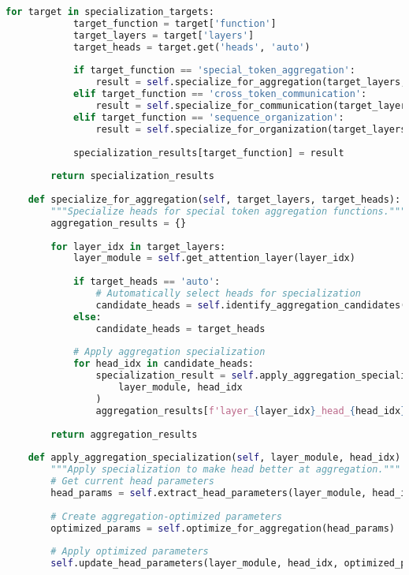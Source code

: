 \begin{lstlisting}[language=Python, caption=Attention pattern analysis and optimization framework]
        for target in specialization_targets:
            target_function = target['function']
            target_layers = target['layers']
            target_heads = target.get('heads', 'auto')
            
            if target_function == 'special_token_aggregation':
                result = self.specialize_for_aggregation(target_layers, target_heads)
            elif target_function == 'cross_token_communication':
                result = self.specialize_for_communication(target_layers, target_heads)
            elif target_function == 'sequence_organization':
                result = self.specialize_for_organization(target_layers, target_heads)
            
            specialization_results[target_function] = result
        
        return specialization_results
    
    def specialize_for_aggregation(self, target_layers, target_heads):
        """Specialize heads for special token aggregation functions."""
        aggregation_results = {}
        
        for layer_idx in target_layers:
            layer_module = self.get_attention_layer(layer_idx)
            
            if target_heads == 'auto':
                # Automatically select heads for specialization
                candidate_heads = self.identify_aggregation_candidates(layer_module)
            else:
                candidate_heads = target_heads
            
            # Apply aggregation specialization
            for head_idx in candidate_heads:
                specialization_result = self.apply_aggregation_specialization(
                    layer_module, head_idx
                )
                aggregation_results[f'layer_{layer_idx}_head_{head_idx}'] = specialization_result
        
        return aggregation_results
    
    def apply_aggregation_specialization(self, layer_module, head_idx):
        """Apply specialization to make head better at aggregation."""
        # Get current head parameters
        head_params = self.extract_head_parameters(layer_module, head_idx)
        
        # Create aggregation-optimized parameters
        optimized_params = self.optimize_for_aggregation(head_params)
        
        # Apply optimized parameters
        self.update_head_parameters(layer_module, head_idx, optimized_params)
        

\end{lstlisting}
